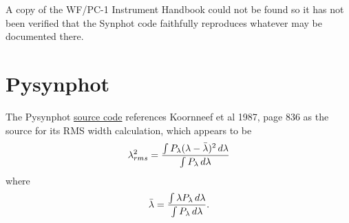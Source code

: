 \documentclass[letterpaper,10pt,english]{sphinxtsr}
\begin{document}
A copy of the WF/PC-1 Instrument Handbook could not be found so it has not been
verified that the Synphot code faithfully reproduces whatever may be documented
there.


\section{Pysynphot}
\label{main:pysynphot}\label{main:rmslam}
The Pysynphot
\href{https://trac.assembla.com/astrolib/browser/trunk/pysynphot/lib/pysynphot/spectrum.py}{source code}
references Koornneef et al 1987, page 836 as the
source for its RMS width calculation, which appears to be
\begin{gather}
\begin{split}\lambda_{rms}^2 = \frac{\int P_{\lambda} (\lambda - \bar{\lambda})^2 \,d\lambda}
{\int P_{\lambda} \,d\lambda}\end{split}\notag
\end{gather}
where
\begin{gather}
\begin{split}\bar{\lambda} = \frac{\int \lambda P_{\lambda} \,d\lambda}
{\int P_{\lambda} \,d\lambda}.\end{split}\notag
\end{gather}


\renewcommand{\indexname}{Index}
\printindex
\end{document}
